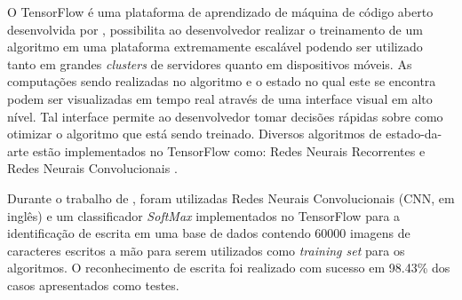 O TensorFlow é uma plataforma de aprendizado de máquina de código aberto desenvolvida por , possibilita ao desenvolvedor realizar o treinamento de um algoritmo em uma plataforma extremamente escalável podendo ser utilizado tanto em grandes \textit{clusters} de servidores quanto em dispositivos móveis. As computações sendo realizadas no algoritmo e o estado no qual este se encontra podem ser visualizadas em tempo real através de uma interface visual em alto nível. Tal interface permite ao desenvolvedor tomar decisões rápidas sobre como otimizar o algoritmo que está sendo treinado. Diversos algoritmos de estado-da-arte estão implementados no TensorFlow como: Redes Neurais Recorrentes \cite{tensorflow_rec} e Redes Neurais Convolucionais \cite{tensorflow_cnn}.


Durante o trabalho de , foram utilizadas Redes Neurais Convolucionais (CNN, em inglês) e um classificador \textit{SoftMax} implementados no TensorFlow para a identificação de escrita em uma base de dados contendo 60000 imagens de caracteres escritos a mão para serem utilizados como \textit{training set} para os algoritmos. O reconhecimento de escrita foi realizado com sucesso em 98.43\% dos casos apresentados como testes.


